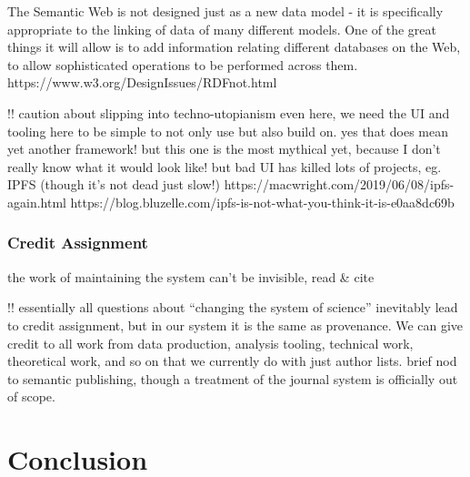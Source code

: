 \documentclass[10pt]{article}
\begin{document}
\begin{multicols}{2}
\begin{leftbar}
The Semantic Web is not designed just as a new data model - it is
specifically appropriate to the linking of data of many different
models. One of the great things it will allow is to add information
relating different databases on the Web, to allow sophisticated
operations to be performed across them.
https://www.w3.org/DesignIssues/RDFnot.html
\end{leftbar}

!! caution about slipping into techno-utopianism even here, we need the
UI and tooling here to be simple to not only use but also build on. yes
that does mean yet another framework! but this one is the most mythical
yet, because I don't really know what it would look like! but bad UI has
killed lots of projects, eg. IPFS (though it's not dead just slow!)
https://macwright.com/2019/06/08/ipfs-again.html
https://blog.bluzelle.com/ipfs-is-not-what-you-think-it-is-e0aa8dc69b

\hypertarget{credit-assignment}{%
\subsubsection{Credit Assignment}\label{credit-assignment}}

the work of maintaining the system can't be invisible, read \& cite \cite{classeDistributedInfrastructureSupport2017, bowkerInformationInfrastructureStudies2010} 

!! essentially all questions about ``changing the system of science''
inevitably lead to credit assignment, but in our system it is the same
as provenance. We can give credit to all work from data production,
analysis tooling, technical work, theoretical work, and so on that we
currently do with just author lists. brief nod to semantic publishing,
though a treatment of the journal system is officially out of scope.

\end{multicols}


\hypertarget{conclusion}{%
\section{Conclusion}\label{conclusion}}
\end{document}
